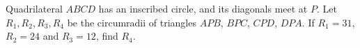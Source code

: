 Quadrilateral $ABCD$ has an inscribed circle, and its diagonals meet at $P$. Let $R_1,R_2,R_3,R_4$ be the circumradii of triangles $APB$, $BPC$, $CPD$, $DPA$. If $R_1=31$, $R_2=24$ and $R_3=12$, find $R_4$.
